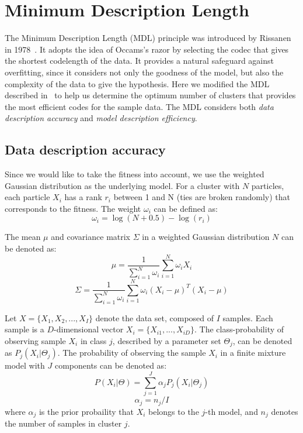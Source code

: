 \section{Minimum Description Length} 
The Minimum Description Length (MDL) principle was introduced by Rissanen in 1978~\cite{Rissanen:1978:MDL}.
It adopts the idea of Occams's razor by selecting the codec that gives the shortest codelength of the data.
It provides a natural safeguard against overfitting, 
since it considers not only the goodness of the model, 
but also the complexity of the data to give the hypothesis.
Here we modified the MDL described in~\cite{Kyrgyzov:2007:KMDL} to help us determine the optimum number of clusters that provides the most efficient codes for the sample data.
The MDL considers both \textit{data description accuracy} and \textit{model description efficiency}.


\subsection{Data description accuracy}

Since we would like to take the fitness into account, we use the weighted Gaussian distribution as the underlying model.
For a cluster with $N$ particles, each particle $X_i$ has a rank $r_i$ between 1 and N (ties are broken randomly) that corresponds to the fitness.
The weight $\omega_i$ can be defined as:
\begin{equation}
\omega_i = \log(N+0.5) - \log(r_i)
\end{equation}

The mean $\mu$ and covariance matrix $\Sigma$ in a weighted Gaussian distribution $N$ can be denoted as:
\begin{equation}
\mu = \frac{1}{\sum_{i=1}^N \omega_i} \sum_{i = 1}^{N} \omega_i X_i
\end{equation}
\begin{equation}
\Sigma = \frac{1}{\sum_{i=1}^N \omega_i} \sum_{i = 1}^{N} \omega_i (X_i - \mu)^T (X_i - \mu)
\end{equation}


Let $X = \{X_1, X_2, ..., X_I\}$ denote the data set, composed of $I$ samples. 
Each sample is a $D$-dimensional vector $X_i = \{X_{i1}, ..., X_{iD}\}$.  
The class-probability of observing sample $X_i$ in class $j$, described by a parameter set $\Theta_j$, can be denoted as $P_j(X_i|\Theta_j)$.
The probability of observing the sample $X_i$ in a finite mixture model with $J$ components can be denoted as:
\begin{equation}
P(X_i|\Theta) = \sum_{j=1}^J \alpha_j P_j ( X_i | \Theta_j )
\end{equation}
\begin{equation}
\alpha_j = n_j / I
\end{equation}
where $\alpha_j$ is the prior probaility that $X_i$ belongs to the $j$-th model, 
and $n_j$ denotes the number of samples in cluster $j$.  

